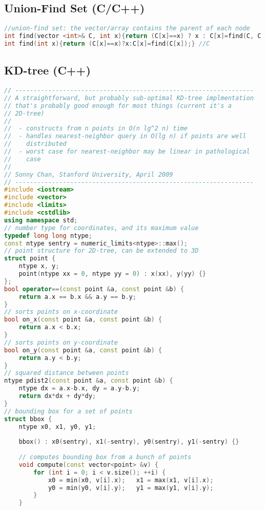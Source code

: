 \subsection{Union-Find Set (C/C++)}
\begin{lstlisting}[language=C++]
//union-find set: the vector/array contains the parent of each node
int find(vector <int>& C, int x){return (C[x]==x) ? x : C[x]=find(C, C[x]);} //C++
int find(int x){return (C[x]==x)?x:C[x]=find(C[x]);} //C
\end{lstlisting}
\subsection{KD-tree (C++)}
\begin{lstlisting}[language=C++]
// -----------------------------------------------------------------
// A straightforward, but probably sub-optimal KD-tree implmentation
// that's probably good enough for most things (current it's a
// 2D-tree)
//
//  - constructs from n points in O(n lg^2 n) time
//  - handles nearest-neighbor query in O(lg n) if points are well
//    distributed
//  - worst case for nearest-neighbor may be linear in pathological
//    case
//
// Sonny Chan, Stanford University, April 2009
// -----------------------------------------------------------------
#include <iostream>
#include <vector>
#include <limits>
#include <cstdlib>
using namespace std;
// number type for coordinates, and its maximum value
typedef long long ntype;
const ntype sentry = numeric_limits<ntype>::max();
// point structure for 2D-tree, can be extended to 3D
struct point {
    ntype x, y;
    point(ntype xx = 0, ntype yy = 0) : x(xx), y(yy) {}
};
bool operator==(const point &a, const point &b) {
    return a.x == b.x && a.y == b.y;
}
// sorts points on x-coordinate
bool on_x(const point &a, const point &b) {
    return a.x < b.x;
}
// sorts points on y-coordinate
bool on_y(const point &a, const point &b) {
    return a.y < b.y;
}
// squared distance between points
ntype pdist2(const point &a, const point &b) {
    ntype dx = a.x-b.x, dy = a.y-b.y;
    return dx*dx + dy*dy;
}
// bounding box for a set of points
struct bbox {
    ntype x0, x1, y0, y1;
    
    bbox() : x0(sentry), x1(-sentry), y0(sentry), y1(-sentry) {}
    
    // computes bounding box from a bunch of points
    void compute(const vector<point> &v) {
        for (int i = 0; i < v.size(); ++i) {
            x0 = min(x0, v[i].x);   x1 = max(x1, v[i].x);
            y0 = min(y0, v[i].y);   y1 = max(y1, v[i].y);
        }
    }
    

\end{lstlisting}
